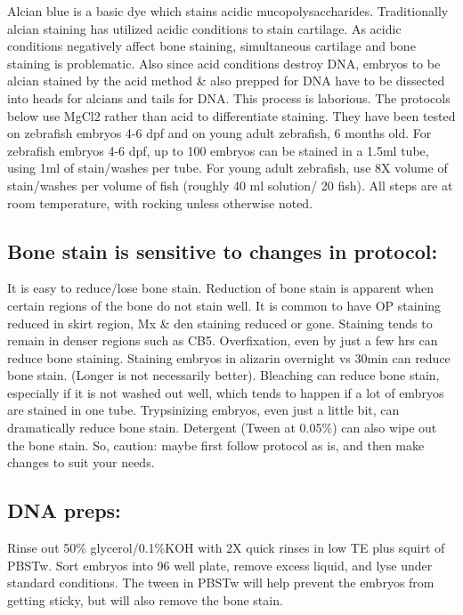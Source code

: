 \documentclass[
  letterpaper,
  DIV=11,
  numbers=noendperiod]{scrreprt}
\begin{document}
Alcian blue is a basic dye which stains acidic mucopolysaccharides.
Traditionally alcian staining has utilized acidic conditions to stain
cartilage. As acidic conditions negatively affect bone staining,
simultaneous cartilage and bone staining is problematic. Also since acid
conditions destroy DNA, embryos to be alcian stained by the acid method
\& also prepped for DNA have to be dissected into heads for alcians and
tails for DNA. This process is laborious. The protocols below use MgCl2
rather than acid to differentiate staining. They have been tested on
zebrafish embryos 4-6 dpf and on young adult zebrafish, 6 months old.
For zebrafish embryos 4-6 dpf, up to 100 embryos can be stained in a
1.5ml tube, using 1ml of stain/washes per tube. For young adult
zebrafish, use 8X volume of stain/washes per volume of fish (roughly 40
ml solution/ 20 fish). All steps are at room temperature, with rocking
unless otherwise noted.

\hypertarget{bone-stain-is-sensitive-to-changes-in-protocol}{%
\subsection{Bone stain is sensitive to changes in
protocol:}\label{bone-stain-is-sensitive-to-changes-in-protocol}}

It is easy to reduce/lose bone stain. Reduction of bone stain is
apparent when certain regions of the bone do not stain well. It is
common to have OP staining reduced in skirt region, Mx \& den staining
reduced or gone. Staining tends to remain in denser regions such as CB5.
Overfixation, even by just a few hrs can reduce bone staining. Staining
embryos in alizarin overnight vs 30min can reduce bone stain. (Longer is
not necessarily better). Bleaching can reduce bone stain, especially if
it is not washed out well, which tends to happen if a lot of embryos are
stained in one tube. Trypsinizing embryos, even just a little bit, can
dramatically reduce bone stain. Detergent (Tween at 0.05\%) can also
wipe out the bone stain. So, caution: maybe first follow protocol as is,
and then make changes to suit your needs.

\hypertarget{dna-preps}{%
\subsection{DNA preps:}\label{dna-preps}}

Rinse out 50\% glycerol/0.1\%KOH with 2X quick rinses in low TE plus
squirt of PBSTw. Sort embryos into 96 well plate, remove excess liquid,
and lyse under standard conditions. The tween in PBSTw will help prevent
the embryos from getting sticky, but will also remove the bone stain.
\end{document}

